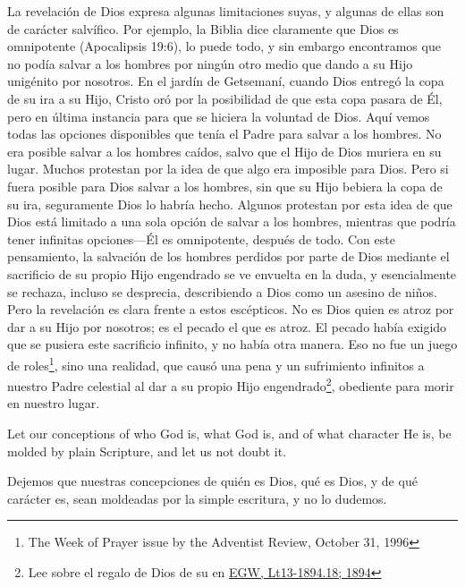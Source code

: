 La revelación de Dios expresa algunas limitaciones suyas, y algunas de ellas son de carácter salvífico. Por ejemplo, la Biblia dice claramente que Dios es omnipotente (Apocalipsis 19:6), lo puede todo, y sin embargo encontramos que no podía salvar a los hombres por ningún otro medio que dando a su Hijo unigénito por nosotros. En el jardín de Getsemaní, cuando Dios entregó la copa de su ira a su Hijo, Cristo oró por la posibilidad de que esta copa pasara de Él, pero en última instancia para que se hiciera la voluntad de Dios. Aquí vemos todas las opciones disponibles que tenía el Padre para salvar a los hombres. No era posible salvar a los hombres caídos, salvo que el Hijo de Dios muriera en su lugar. Muchos protestan por la idea de que algo era imposible para Dios. Pero si fuera posible para Dios salvar a los hombres, sin que su Hijo bebiera la copa de su ira, seguramente Dios lo habría hecho. Algunos protestan por esta idea de que Dios está limitado a una sola opción de salvar a los hombres, mientras que podría tener infinitas opciones—Él es omnipotente, después de todo. Con este pensamiento, la salvación de los hombres perdidos por parte de Dios mediante el sacrificio de su propio Hijo engendrado se ve envuelta en la duda, y esencialmente se rechaza, incluso se desprecia, describiendo a Dios como un asesino de niños. Pero la revelación es clara frente a estos escépticos. No es Dios quien es atroz por dar a su Hijo por nosotros; es el pecado el que es atroz. El pecado había exigido que se pusiera este sacrificio infinito, y no había otra manera. Eso no fue un juego de roles\footnote{The Week of Prayer issue by the Adventist Review, October 31, 1996}, sino una realidad, que causó una pena y un sufrimiento infinitos a nuestro Padre celestial al dar a su propio Hijo engendrado\footnote{Lee sobre el regalo de Dios de su  en \href{https://egwwritings.org/?ref=en_Lt13-1894.18&para=5486.24}{{EGW, Lt13-1894.18; 1894}}}, obediente para morir en nuestro lugar.


Let our conceptions of who God is, what God is, and of what character He is, be molded by plain Scripture, and let us not doubt it.


Dejemos que nuestras concepciones de quién es Dios, qué es Dios, y de qué carácter es, sean moldeadas por la simple escritura, y no lo dudemos.





% 
